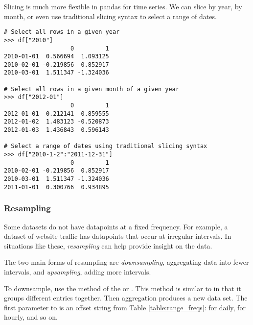 Slicing is much more flexible in pandas for time series. We can slice by year, by month, or even use traditional slicing syntax to select a range of dates.

\begin{lstlisting}
# Select all rows in a given year
>>> df["2010"]
                   0         1
2010-01-01  0.566694  1.093125
2010-02-01 -0.219856  0.852917
2010-03-01  1.511347 -1.324036

# Select all rows in a given month of a given year
>>> df["2012-01"]
                   0         1
2012-01-01  0.212141  0.859555
2012-01-02  1.483123 -0.520873
2012-01-03  1.436843  0.596143

# Select a range of dates using traditional slicing syntax
>>> df["2010-1-2":"2011-12-31"]
                   0         1
2010-02-01 -0.219856  0.852917
2010-03-01  1.511347 -1.324036
2011-01-01  0.300766  0.934895
\end{lstlisting}

\subsubsection*{Resampling} %

Some datasets do not have datapoints at a fixed frequency.
For example, a dataset of website traffic has datapoints that occur at irregular intervals.
In situations like these, \emph{resampling} can help provide insight on the data.

The two main forms of resampling are \emph{downsampling}, aggregating data into fewer intervals, and \emph{upsampling}, adding more intervals.

To downsample, use the  method of the  or .
This method is similar to  in that it groups different entries together.
Then aggregation produces a new data set.
The first parameter to  is an offset string from Table \ref{table:range_freqs}:  for daily,  for hourly, and so on.

